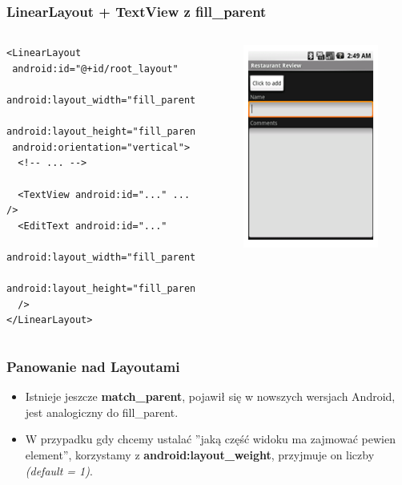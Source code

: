 \begin{frame}[fragile]\frametitle{LinearLayout + TextView z fill\_parent}
 \begin{columns}
  \begin{verbatim}
<LinearLayout
 android:id="@+id/root_layout"
 android:layout_width="fill_parent"
 android:layout_height="fill_parent"
 android:orientation="vertical">
  <!-- ... -->

  <TextView android:id="..." ... />
  <EditText android:id="..."
   android:layout_width="fill_parent"
   android:layout_height="fill_parent" 
  />
</LinearLayout>

  \end{verbatim}
  \begin{figure}
   \includegraphics[width=.7\textwidth]{images/linearlayout_fill}   
  \end{figure}

 \end{columns}
\end{frame}

\begin{frame}[fragile]\frametitle{Panowanie nad Layoutami}
\begin{itemize}
 \item Istnieje jeszcze \textbf{match\_parent}, pojawił się w nowszych wersjach Android, jest analogiczny do fill\_parent.
 \item W przypadku gdy chcemy ustalać ''jaką część widoku ma zajmować pewien element'', korzystamy z \textbf{android:layout\_weight}, przyjmuje on liczby \textit{(default = 1)}.
\end{itemize}
\end{frame}

